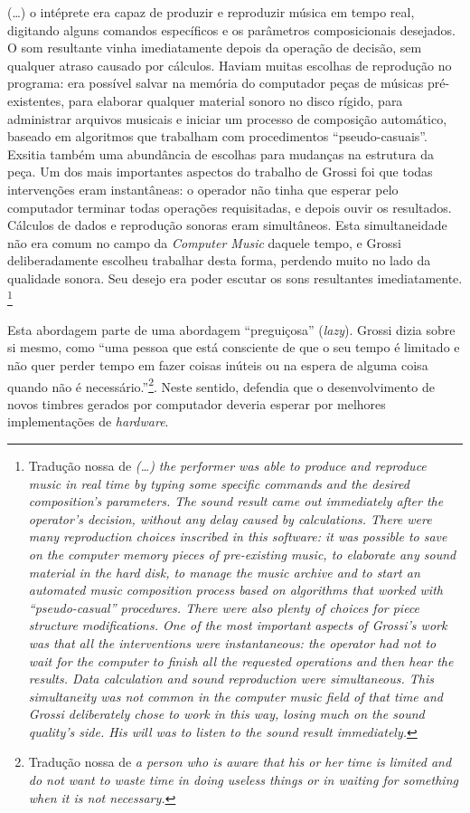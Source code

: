\begin{citacao}
(\ldots) o intéprete era capaz de produzir e reproduzir música em tempo real, digitando alguns comandos específicos e os parâmetros composicionais desejados. O som resultante vinha imediatamente depois da operação de decisão, sem qualquer atraso causado por cálculos. Haviam muitas escolhas de reprodução no programa: era possível salvar na memória do computador peças de músicas pré-existentes, para elaborar qualquer material sonoro no disco rígido, para administrar arquivos musicais e iniciar um processo de composição automático, baseado em algoritmos que trabalham com procedimentos ``pseudo-casuais''. Exsitia também uma abundância de escolhas para mudanças na estrutura da peça. Um dos mais importantes aspectos do trabalho de Grossi foi que todas intervenções eram instantâneas: o operador não tinha que esperar pelo computador terminar todas operações requisitadas, e depois ouvir os resultados. Cálculos de dados e reprodução sonoras eram simultâneos. Esta simultaneidade não era comum no campo da \emph{Computer Music} daquele tempo, e Grossi deliberadamente escolheu trabalhar desta forma, perdendo muito no lado da qualidade sonora. Seu desejo era poder escutar os sons resultantes imediatamente. \footnote{Tradução nossa de \emph{(\ldots) the performer was able to produce and reproduce music in real time by typing some specific commands and the desired composition's parameters. The sound result came out immediately after the operator's decision, without any delay caused by calculations. There were many reproduction choices inscribed in this software: it was possible to save on the computer memory pieces of pre-existing music, to elaborate any sound material in the hard disk, to manage the music archive and to start an automated music composition process based on algorithms that worked with “pseudo-casual” procedures. There were also plenty of choices for piece structure modifications. One of the most important aspects of Grossi’s work was that all the interventions were instantaneous: the operator had not to wait for the computer to finish all the requested operations and then hear the results. Data calculation and sound reproduction were simultaneous. This simultaneity was not common in the computer music field of that time and Grossi deliberately chose to work in this way, losing much on the sound quality’s side. His will was to listen to the sound result immediately.}}
\end{citacao}

Esta abordagem parte de uma abordagem ``preguiçosa'' (\emph{lazy}). Grossi dizia sobre si mesmo, como ``uma pessoa que está consciente de que o seu tempo é limitado e não quer perder tempo em fazer coisas inúteis ou na espera de alguma coisa quando não é necessário.''\footnote{Tradução nossa de \emph{a person who is aware that his or her time is limited and do not want to waste time in doing useless things or in waiting for something when it is not necessary.}}. Neste sentido, defendia que o desenvolvimento de novos timbres gerados por computador deveria esperar por melhores implementações de \emph{hardware}. 

